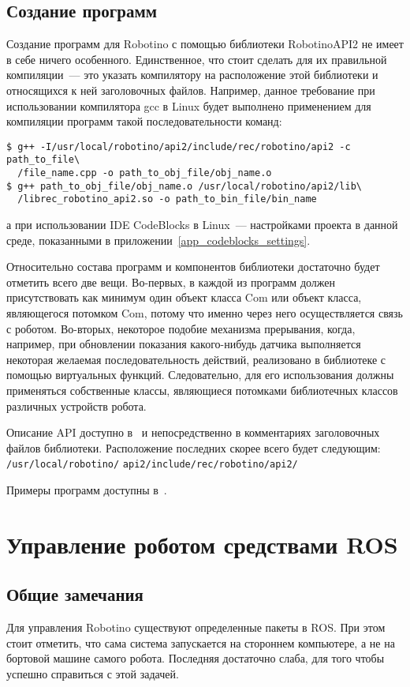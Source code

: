 \subsection{Создание программ}
Создание программ для Robotino с помощью библиотеки RobotinoAPI2 не имеет в себе ничего особенного.
Единственное, что стоит сделать для их правильной компиляции~--- это указать компилятору на расположение этой библиотеки и относящихся к ней  заголовочных файлов.
Например, данное требование при использовании компилятора gcc в Linux будет выполнено применением для компиляции программ такой последовательности команд:
\begin{lstlisting}[style=bash_commands]
$ g++ -I/usr/local/robotino/api2/include/rec/robotino/api2 -c path_to_file\
  /file_name.cpp -o path_to_obj_file/obj_name.o
$ g++ path_to_obj_file/obj_name.o /usr/local/robotino/api2/lib\
  /librec_robotino_api2.so -o path_to_bin_file/bin_name
\end{lstlisting}
а при использовании IDE CodeBlocks в Linux~--- настройками проекта в данной среде, показанными в приложении~\ref{app_codeblocks_settings}.

Относительно состава программ и компонентов библиотеки достаточно будет отметить всего две вещи.
Во-первых, в каждой из программ должен присутствовать как минимум один объект класса Com или объект класса, являющегося потомком Com, потому что именно через него осуществляется связь с роботом.
Во-вторых, некоторое подобие механизма прерывания, когда, например, при обновлении показания какого-нибудь датчика выполняется некоторая желаемая последовательность действий, реализовано в библиотеке с помощью виртуальных функций.
Следовательно, для его использования должны применяться собственные классы, являющиеся потомками библиотечных классов различных устройств робота.

Описание API доступно в~\cite{api2_documentation} и непосредственно в комментариях заголовочных файлов библиотеки.
Расположение последних скорее всего будет следующим: \verb|/usr/local/robotino/| \verb|api2/include/rec/robotino/api2/|

Примеры программ доступны в~\cite{robotino_examples}.



\section{Управление роботом средствами ROS}
\subsection{Общие замечания}
Для управления Robotino существуют определенные пакеты в ROS.
При этом стоит отметить, что сама система запускается на стороннем компьютере, а не на бортовой машине самого робота.
Последняя достаточно слаба, для того чтобы успешно справиться с этой задачей.

